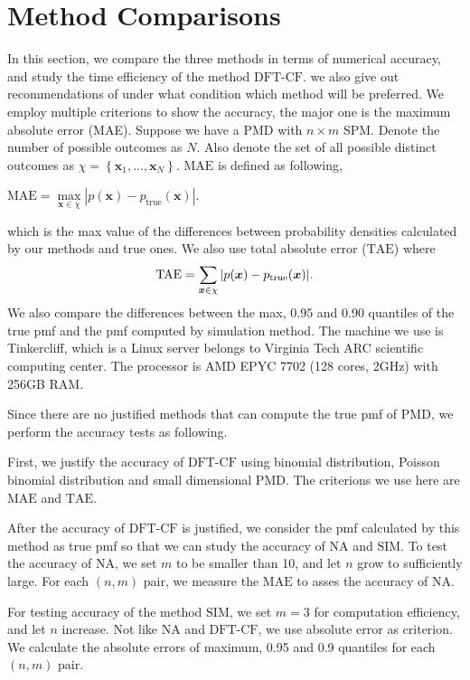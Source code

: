 \documentclass[12pt]{article}
\newcommand{\TAE}{{\textrm{TAE}}}
\newcommand{\MAE}{{\textrm{MAE}}}
\newcommand{\PMD}{\textrm{PMD}}
\newcommand{\xvec}{\boldsymbol{x}}
\newcommand{\SIM}{{\textrm{SIM}}}
\newcommand{\NA}{{\textrm{NA}}}
\newcommand{\dft}{{\textrm{DFT-CF}}}
\begin{document}
\section{Method Comparisons}\label{sec:Method Comparisons}
In this section, we compare the three methods in terms of numerical accuracy, and study the time efficiency of the method $\dft$. we also give out recommendations of under what condition which method will be preferred. We employ multiple criterions to show the accuracy, the major one is the maximum absolute error (MAE). Suppose we have a PMD with $n\times m$ SPM. Denote the number of possible outcomes as $N$. Also denote the set of all possible distinct outcomes as $\chi = \left\{\xvec_1,\dots, \xvec_{N}\right\}$. $\MAE$ is defined as following,
\begin{center}
$\mathrm{\MAE} = \underset{\xvec \in \chi}{\max}|p(\xvec) - p_{\text{true}}(\xvec)|$.
\end{center}
which is the max value of the differences between probability densities calculated by our methods and true ones.
We also use total absolute error ($\TAE$)  where
\begin{equation*}
    \mbox{\TAE} = \sum_{\xvec \in \chi} |p(\xvec) - p_{\text{true}}(\xvec)|.
\end{equation*}
We also compare the differences between the max, $0.95$ and $0.90$ quantiles of the true pmf and the pmf computed by simulation method. The machine we use is Tinkercliff, which is a Linux server belongs to Virginia Tech ARC scientific computing center. The processor is AMD EPYC 7702 (128 cores, 2GHz) with 256GB RAM. 

Since there are no justified methods that can compute the true pmf of $\PMD$, we perform the accuracy tests as following. 

First, we justify the accuracy of $\dft$ using binomial distribution, Poisson binomial distribution and small dimensional PMD. The criterions we use here are $\MAE$ and $\TAE$. 

After the accuracy of $\dft$ is justified, we consider the pmf calculated by this method as true pmf so that we can study the accuracy of $\NA$ and $\SIM$. To test the accuracy of $\NA$, we set $m$ to be smaller than 10, and let $n$ grow to sufficiently large. For each $(n,m)$ pair, we measure the $\MAE$ to asses the accuracy of $\NA$.

For testing accuracy of the method $\SIM$, we set $m=3$ for computation efficiency, and let $n$ increase. Not like $\NA$ and $\dft$, we use absolute error as criterion. We calculate the absolute errors of maximum, 0.95 and 0.9 quantiles for each $(n,m)$ pair.
\end{document}

